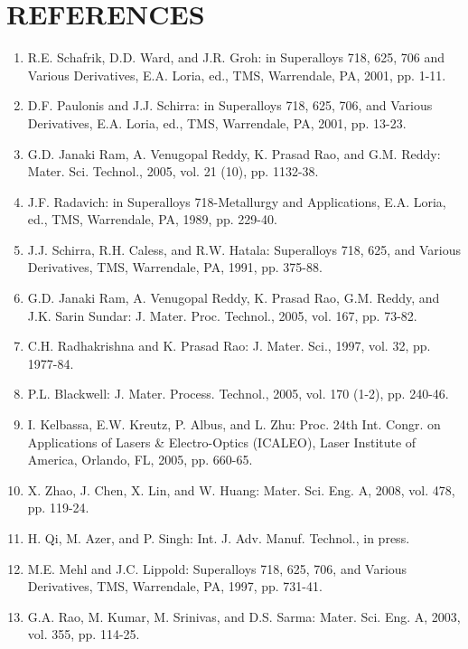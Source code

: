 \documentclass[10pt]{article}
\begin{document}
\section*{REFERENCES}
\begin{enumerate}
  \item R.E. Schafrik, D.D. Ward, and J.R. Groh: in Superalloys 718, 625, 706 and Various Derivatives, E.A. Loria, ed., TMS, Warrendale, PA, 2001, pp. 1-11.

  \item D.F. Paulonis and J.J. Schirra: in Superalloys 718, 625, 706, and Various Derivatives, E.A. Loria, ed., TMS, Warrendale, PA, 2001, pp. 13-23.

  \item G.D. Janaki Ram, A. Venugopal Reddy, K. Prasad Rao, and G.M. Reddy: Mater. Sci. Technol., 2005, vol. 21 (10), pp. 1132-38.

  \item J.F. Radavich: in Superalloys 718-Metallurgy and Applications, E.A. Loria, ed., TMS, Warrendale, PA, 1989, pp. 229-40.

  \item J.J. Schirra, R.H. Caless, and R.W. Hatala: Superalloys 718, 625, and Various Derivatives, TMS, Warrendale, PA, 1991, pp. 375-88.

  \item G.D. Janaki Ram, A. Venugopal Reddy, K. Prasad Rao, G.M. Reddy, and J.K. Sarin Sundar: J. Mater. Proc. Technol., 2005, vol. 167, pp. 73-82.

  \item C.H. Radhakrishna and K. Prasad Rao: J. Mater. Sci., 1997, vol. 32, pp. 1977-84.

  \item P.L. Blackwell: J. Mater. Process. Technol., 2005, vol. 170 (1-2), pp. 240-46.

  \item I. Kelbassa, E.W. Kreutz, P. Albus, and L. Zhu: Proc. 24th Int. Congr. on Applications of Lasers \& Electro-Optics (ICALEO), Laser Institute of America, Orlando, FL, 2005, pp. 660-65.

  \item X. Zhao, J. Chen, X. Lin, and W. Huang: Mater. Sci. Eng. A, 2008, vol. 478, pp. 119-24.

  \item H. Qi, M. Azer, and P. Singh: Int. J. Adv. Manuf. Technol., in press.

  \item M.E. Mehl and J.C. Lippold: Superalloys 718, 625, 706, and Various Derivatives, TMS, Warrendale, PA, 1997, pp. 731-41.

  \item G.A. Rao, M. Kumar, M. Srinivas, and D.S. Sarma: Mater. Sci. Eng. A, 2003, vol. 355, pp. 114-25.

\end{enumerate}
\end{document}
